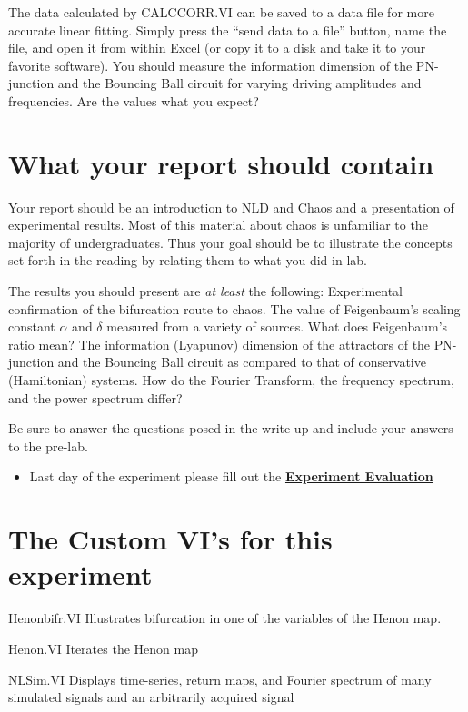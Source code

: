\documentclass{../lab}
\begin{document}
The data calculated by CALCCORR.VI can be saved to a data file for more accurate linear fitting. Simply press the ``send data to a file'' button, name the file, and open it from within Excel (or copy it to a disk and take it to your favorite software). You should measure the information dimension of the PN-junction and the Bouncing Ball circuit for varying driving amplitudes and frequencies. Are the values what you expect?

\section{What your report should contain}

Your report should be an introduction to NLD and Chaos and a presentation of experimental results. Most of this material about chaos is unfamiliar to the majority of undergraduates. Thus your goal should be to illustrate the concepts set forth in the reading by relating them to what you did in lab.

The results you should present are \emph{at least} the following: Experimental confirmation of the bifurcation route to chaos. The value of Feigenbaum's scaling constant $\alpha$ and $\delta$ measured from a variety of sources. What does Feigenbaum's ratio mean? The information (Lyapunov) dimension of the attractors of the PN-junction and the Bouncing Ball circuit as compared to that of conservative (Hamiltonian) systems. How do the Fourier Transform, the frequency spectrum, and the power spectrum differ?

Be sure to answer the questions posed in the write-up and include your answers to the pre-lab.

\begin{itemize}
    \item Last day of the experiment please fill out the \href{\ExperimentEvaluation}{\textbf{Experiment Evaluation}}

\end{itemize}

\section{The Custom VI's for this experiment}

Henonbifr.VI Illustrates bifurcation in one of the variables of the Henon map.

Henon.VI Iterates the Henon map

NLSim.VI Displays time-series, return maps, and Fourier spectrum of many simulated signals and an arbitrarily acquired signal
\end{document}
